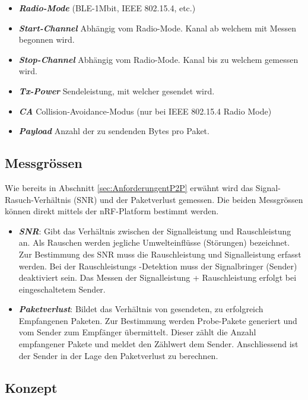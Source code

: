 \begin{itemize}
	\item \textit{\textbf{Radio-Mode}} (BLE-1Mbit, IEEE 802.15.4, etc.)
	\item \textit{\textbf{Start-Channel}} Abhängig vom Radio-Mode. Kanal ab welchem mit Messen begonnen wird.
	\item \textit{\textbf{Stop-Channel}} Abhängig vom Radio-Mode. Kanal bis zu welchem gemessen wird. 
	\item \textit{\textbf{Tx-Power}} Sendeleistung, mit welcher gesendet wird. 
	\item \textit{\textbf{CA}} Collision-Avoidance-Modus (nur bei IEEE 802.15.4 Radio Mode)
	\item \textit{\textbf{Payload}} Anzahl der zu sendenden Bytes pro Paket.
\end{itemize}


\subsection{Messgrössen}\label{sec:MessgrössenP2P}

Wie bereits in Abschnitt \ref{sec:AnforderungentP2P} erwähnt wird das Signal-Rasuch-Verhältnis (SNR) und der Paketverlust gemessen. Die beiden Messgrössen können direkt mittels der nRF-Platform bestimmt werden.

\begin{itemize}
	\item \textbf{\textit{SNR}}: Gibt das Verhältnis zwischen der Signalleistung und Rauschleistung an. Als Rauschen werden jegliche Umwelteinflüsse (Störungen) bezeichnet. Zur Bestimmung des SNR muss die Rauschleistung und Signalleistung erfasst werden. Bei der Rauschleistungs -Detektion muss der Signalbringer (Sender) deaktiviert sein. Das Messen der Signalleistung + Rauschleistung erfolgt bei eingeschaltetem Sender.
	\item \textbf{\textit{Paketverlust}}: Bildet das Verhältnis von gesendeten, zu erfolgreich Empfangenen Paketen. Zur Bestimmung werden Probe-Pakete generiert und vom Sender zum Empfänger übermittelt. Dieser zählt die Anzahl empfangener Pakete und meldet den Zählwert dem Sender. Anschliessend ist der Sender in der Lage den Paketverlust zu berechnen. 
\end{itemize} 


\subsection{Konzept}\label{sec:KonzeptP2P}

